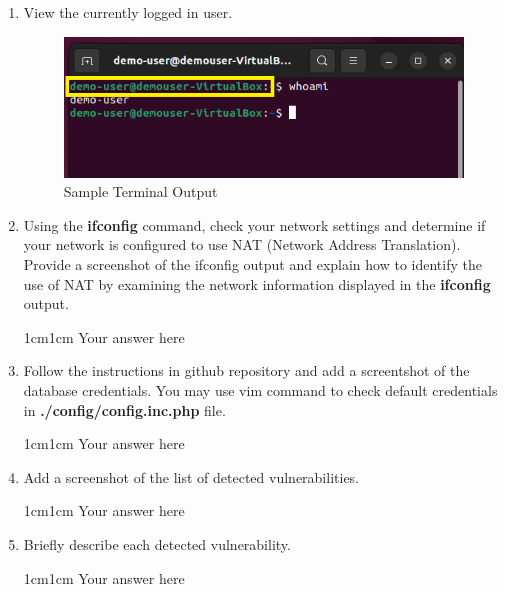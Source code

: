 \documentclass[11pt,letterpaper]{article}
\newenvironment{answer}{\em \color{blue} \begin{adjustwidth}{1cm}{1cm}}{\end{adjustwidth}}
\begin{document}
	\begin{enumerate}
		
		\item View the currently logged in user.
		
		\begin{figure}[h]
			\centering
			\includegraphics[width=0.65\columnwidth]{images/ex4-sample-terminal-output.png}
			\caption{Sample Terminal Output} \label{fig:sample-terminal-output}
		\end{figure}
		
		\item Using the  \textbf{ifconfig} command, check your network settings and determine if your network is configured to use NAT (Network Address Translation). Provide a screenshot of the ifconfig output and explain how to identify the use of NAT by examining the network information displayed in the  \textbf{ifconfig} output.
		
		\begin{answer}
			Your answer here
		\end{answer}
		
		
		
		\item Follow the instructions in github repository and add a screentshot of the database credentials. You may use vim command to check default credentials in \textbf{./config/config.inc.php} file.
		
		\begin{answer}
			Your answer here
		\end{answer}
		
		\item Add a screenshot of the list of detected vulnerabilities.
		
		\begin{answer}
			Your answer here
		\end{answer}
		
		\item Briefly describe each detected vulnerability.
		
		\begin{answer}
			Your answer here
		\end{answer}
		

\end{enumerate}
\end{document}
